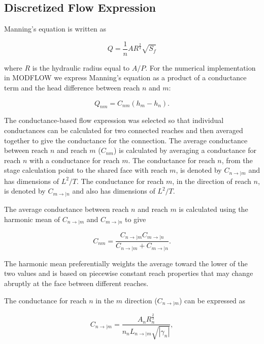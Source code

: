\documentclass[fleqn]{article}
\begin{document}
\subsection{Discretized Flow Expression}

Manning's equation is written as

\begin{equation}
  Q = \frac{1}{n} A R^{\frac{2}{3}} \sqrt{S_f}
\end{equation}

\noindent where $R$ is the hydraulic radius equal to $A / P$.  For the numerical implementation in MODFLOW we express Manning's equation as a product of a conductance term and the head difference between reach $n$ and $m$:

\begin{equation}
  Q_{nm} = C_{nm} \left ( h_m - h_n \right ).
\end{equation}

\noindent The conductance-based flow expression was selected so that individual conductances can be calculated for two connected reaches and then averaged together to give the conductance for the connection.  The average conductance between reach $n$ and reach $m$ ($C_{nm}$) is calculated by averaging a conductance for reach $n$ with a conductance for reach $m$.  The conductance for reach $n$, from the stage calculation point to the shared face with reach $m$, is denoted by $C_{n \rightarrow | m}$ and has dimensions of $L^2/T$.  The conductance for reach $m$, in the direction of reach $n$, is denoted by $C_{m \rightarrow | n}$ and also has dimensions of $L^2/T$.

The average conductance between reach $n$ and reach $m$ is calculated using the harmonic mean of $C_{n \rightarrow | m}$ and $C_{m \rightarrow | n}$ to give

\begin{equation}
  C_{nm} = \frac{C_{n \rightarrow | m}  C_{m \rightarrow | n}}{C_{n \rightarrow | m} + C_{m \rightarrow | n}}.
\end{equation}

\noindent The harmonic mean preferentially weights the average toward the lower of the two values and is based on piecewise constant reach properties that may change abruptly at the face between different reaches.

The conductance for reach $n$ in the $m$ direction ($C_{n \rightarrow | m}$) can be expressed as

\begin{equation}
  C_{n \rightarrow | m} = 
  \frac{
  A_n 
  R_{n}^{\frac{2}{3}}
  }
  {n_n
  L_{n \rightarrow | m}
  \sqrt{| \gamma_n |}
  },
\label{eqn:cn}
\end{equation}
\end{document}
